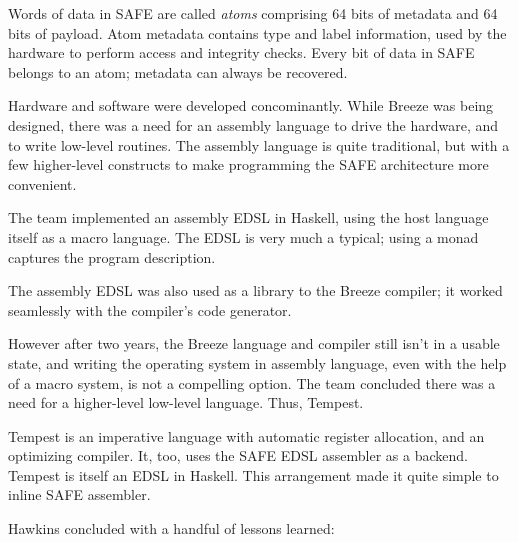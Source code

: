 \documentclass{jfp1}
\begin{document}
Words of data in SAFE are called \textit{atoms} comprising 64 bits of 
metadata and 64 bits of payload. Atom metadata contains type and
label information, used by the hardware to perform access and integrity
checks. Every bit of data in SAFE belongs to an atom; metadata can always
be recovered.

Hardware and software were developed concominantly. While Breeze was
being designed, there was a need for an assembly language to drive the 
hardware, and to write low-level routines. The assembly language is quite
traditional, but with a few higher-level constructs to make programming
the SAFE architecture more convenient.

The team implemented an assembly EDSL in Haskell, using the host
language itself as a macro language. The EDSL is very much a typical;
using a monad captures the program description. 

The assembly EDSL was also used as a library to the Breeze compiler;
it worked seamlessly with the compiler's code generator.

However after two years, the Breeze language and compiler still isn't in
a usable state, and writing the operating system in assembly language,
even with the help of a macro system, is not a compelling option. The
team concluded there was a need for a higher-level low-level language. Thus,
Tempest.

Tempest is an imperative language with automatic register allocation,
and an optimizing compiler. It, too, uses the SAFE EDSL assembler
as a backend. Tempest is itself an EDSL in Haskell. This arrangement
made it quite simple to inline SAFE assembler.

Hawkins concluded with a handful of lessons learned:
\end{document}
